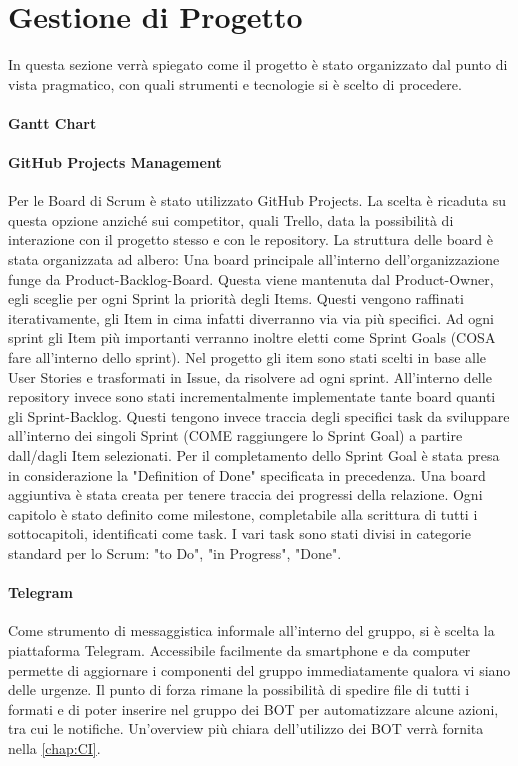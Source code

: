    
    
    

\section{Gestione di Progetto}
In questa sezione verrà spiegato come il progetto è stato organizzato dal punto di vista pragmatico, con quali strumenti e tecnologie si è scelto di procedere.
    \paragraph{Gantt Chart}
    \paragraph{GitHub Projects Management}
    Per le Board di Scrum è stato utilizzato GitHub Projects. La scelta è ricaduta su questa opzione anziché sui competitor, quali Trello, data la possibilità di interazione con il progetto stesso e con le repository. 
    La struttura delle board è stata organizzata ad albero:
    Una board principale all'interno dell'organizzazione funge da Product-Backlog-Board. Questa viene mantenuta dal Product-Owner, egli sceglie per ogni Sprint la priorità degli Items. Questi vengono raffinati iterativamente, gli Item in cima infatti diverranno via via più specifici. Ad ogni sprint gli Item più importanti verranno inoltre eletti come Sprint Goals (COSA fare all'interno dello sprint). 
    Nel progetto gli item sono stati scelti in base alle User Stories e trasformati in Issue, da risolvere ad ogni sprint.
    All'interno delle repository invece sono stati incrementalmente implementate tante board quanti gli Sprint-Backlog. Questi tengono invece traccia degli specifici task da sviluppare all'interno dei singoli Sprint (COME raggiungere lo Sprint Goal) a partire dall/dagli Item selezionati. 
    Per il completamento dello Sprint Goal è stata presa in considerazione  la "Definition of Done" specificata in precedenza.
    Una board aggiuntiva è stata creata per tenere traccia dei progressi della relazione. Ogni capitolo è stato definito come milestone, completabile alla scrittura di tutti i sottocapitoli, identificati come task.
    I vari task sono stati divisi in categorie standard per lo Scrum: "to Do", "in Progress", "Done".
    
    \paragraph{Telegram}
    Come strumento di messaggistica informale all'interno del gruppo, si è scelta la piattaforma Telegram. Accessibile facilmente da smartphone e da computer permette di aggiornare i componenti del gruppo immediatamente qualora vi siano delle urgenze. Il punto di forza rimane la  possibilità di spedire file di tutti i formati e di poter inserire nel gruppo dei BOT per automatizzare alcune azioni, tra cui le notifiche. Un'overview più chiara dell'utilizzo dei BOT verrà fornita nella \autoref{chap:CI}.
    
